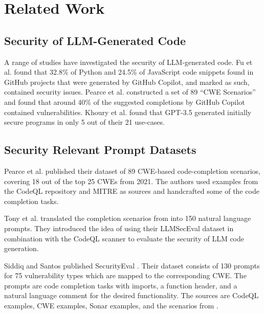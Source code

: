 \section{Related Work}
\label{sec:related_work}


\subsection{Security of LLM-Generated Code}
A range of studies have investigated the security of LLM-generated code. Fu et al. \cite{Fu2023SecurityWO} found that 32.8\% of Python and 24.5\% of JavaScript code snippets found in GitHub projects that were generated by GitHub Copilot, and marked as such, contained security issues. Pearce et al. \cite{pearce2022asleep} constructed a set of 89 ``CWE Scenarios'' and found that around 40\% of the suggested completions by GitHub Copilot contained vulnerabilities. Khoury et al. \cite{Khoury2023HowSI} found that GPT-3.5 generated initially secure programs in only 5 out of their 21 use-cases. 



\subsection{Security Relevant Prompt Datasets}
Pearce et al. \cite{pearce2022asleep} published their dataset of 89 CWE-based code-completion scenarios, covering 18 out of the top 25 CWEs from 2021. The authors used examples from the CodeQL repository and MITRE \cite{mitre_cwe} as sources and handcrafted some of the code completion tasks.

Tony et al. \cite{Tony2023LLMSecEvalAD} translated the completion scenarios from \cite{pearce2022asleep} into 150 natural language prompts. They introduced the idea of using their LLMSecEval dataset in combination with the CodeQL scanner to evaluate the security of LLM code generation.

Siddiq and Santos published SecurityEval \cite{SecurityEval}.
Their dataset consists of 130 prompts for 75 vulnerability types which are mapped to the corresponding CWE.
The prompts are code completion tasks with imports, a function header, and a natural language comment for the desired functionality.
The sources are CodeQL examples, CWE examples, Sonar examples, and the scenarios from \cite{pearce2022asleep}.

